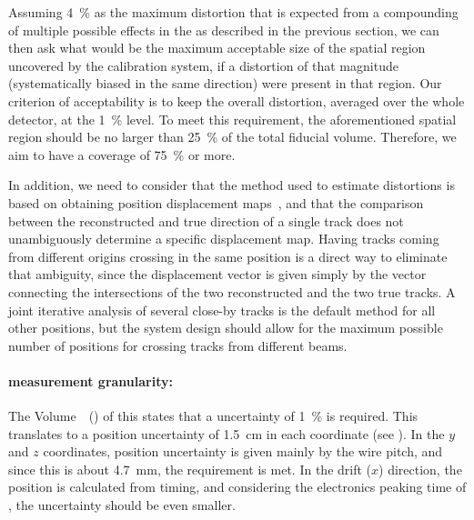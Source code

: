 Assuming \SI{4}{\%} as the maximum \efield distortion %
that is %
expected from a compounding of multiple possible effects in the   %
as described in the previous section,
we can then ask what would be the maximum acceptable size of the spatial region uncovered by the calibration system, if a distortion of that magnitude (systematically biased in the same direction) were present in that region. Our criterion of acceptability is to keep the overall \efield distortion, averaged over the whole detector, at the \SI{1}{\%} level. 
To meet this requirement, the aforementioned spatial region should be no larger than \SI{25}{\%} of the total fiducial volume. Therefore, we aim to have a coverage of \SI{75}{\%} or more.

In addition, we need to consider that the method used to estimate \efield distortions is based on obtaining position displacement maps~\cite{bib:uBlaser2019}, and that the comparison between the reconstructed and true direction of a single track does not %
unambiguously determine a specific displacement map. Having tracks coming from different origins crossing in the same position is a direct way to eliminate that ambiguity, since the displacement vector is given simply by the vector connecting the intersections of the two reconstructed and the two true tracks. A joint iterative analysis of several close-by tracks is the default method for all other positions, but the system design should allow for the maximum possible number of positions %
for crossing tracks from different beams.

\paragraph{\efield measurement granularity:}

The Volume~\volnumberphysics~(\voltitlephysics) of this  states that a  uncertainty of \SI{1}{\%} is required. 
This translates to a position uncertainty of \SI{1.5}{\cm} in each coordinate (see  \spchapa). 
In the $y$ and $z$ coordinates, position uncertainty is given mainly by the  wire pitch, and since this is about \SI{4.7}{\mm}, the requirement is met. In the drift ($x$) direction, the position is calculated from timing, and considering the electronics peaking time of \fepeaktime, the uncertainty should be even smaller.


